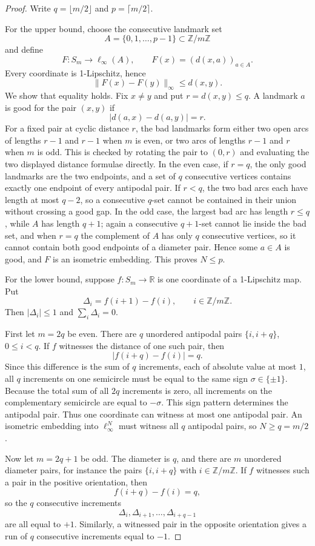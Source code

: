 \documentclass[11pt]{article}
\newcommand{\Z}{\mathbb Z}
\newcommand{\R}{\mathbb R}
\begin{document}
\begin{proof}
Write $q=\lfloor m/2\rfloor$ and $p=\lceil m/2\rceil$.

For the upper bound, choose the consecutive landmark set
\[
  A=\{0,1,\ldots,p-1\}\subset \Z/m\Z
\]
and define
\[
  F:S_m\longrightarrow \ell_\infty(A),
  \qquad
  F(x)=(d(x,a))_{a\in A}.
\]
Every coordinate is 1-Lipschitz, hence
\[
  \|F(x)-F(y)\|_\infty\leq d(x,y).
\]
We show that equality holds. Fix $x\neq y$ and put $r=d(x,y)\leq q$. A landmark $a$ is good for the pair $(x,y)$ if
\[
  |d(a,x)-d(a,y)|=r.
\]
For a fixed pair at cyclic distance $r$, the bad landmarks form either two open arcs of lengths $r-1$ and $r-1$ when $m$ is even, or two arcs of lengths $r-1$ and $r$ when $m$ is odd. This is checked by rotating the pair to $(0,r)$ and evaluating the two displayed distance formulae directly. In the even case, if $r=q$, the only good landmarks are the two endpoints, and a set of $q$ consecutive vertices contains exactly one endpoint of every antipodal pair. If $r<q$, the two bad arcs each have length at most $q-2$, so a consecutive $q$-set cannot be contained in their union without crossing a good gap. In the odd case, the largest bad arc has length $r\leq q$, while $A$ has length $q+1$; again a consecutive $q+1$-set cannot lie inside the bad set, and when $r=q$ the complement of $A$ has only $q$ consecutive vertices, so it cannot contain both good endpoints of a diameter pair. Hence some $a\in A$ is good, and $F$ is an isometric embedding. This proves $N\leq p$.

For the lower bound, suppose $f:S_m\to\R$ is one coordinate of a 1-Lipschitz map. Put
\[
  \Delta_i=f(i+1)-f(i),\qquad i\in\Z/m\Z.
\]
Then $|\Delta_i|\leq 1$ and $\sum_i\Delta_i=0$.

First let $m=2q$ be even. There are $q$ unordered antipodal pairs $\{i,i+q\}$, $0\leq i<q$. If $f$ witnesses the distance of one such pair, then
\[
  |f(i+q)-f(i)|=q.
\]
Since this difference is the sum of $q$ increments, each of absolute value at most $1$, all $q$ increments on one semicircle must be equal to the same sign $\sigma\in\{\pm1\}$. Because the total sum of all $2q$ increments is zero, all increments on the complementary semicircle are equal to $-\sigma$. This sign pattern determines the antipodal pair. Thus one coordinate can witness at most one antipodal pair. An isometric embedding into $\ell_\infty^N$ must witness all $q$ antipodal pairs, so $N\geq q=m/2$.

Now let $m=2q+1$ be odd. The diameter is $q$, and there are $m$ unordered diameter pairs, for instance the pairs $\{i,i+q\}$ with $i\in\Z/m\Z$. If $f$ witnesses such a pair in the positive orientation, then
\[
  f(i+q)-f(i)=q,
\]
so the $q$ consecutive increments
\[
  \Delta_i,\Delta_{i+1},\ldots,\Delta_{i+q-1}
\]
are all equal to $+1$. Similarly, a witnessed pair in the opposite orientation gives a run of $q$ consecutive increments equal to $-1$.


\end{proof}
\end{document}
